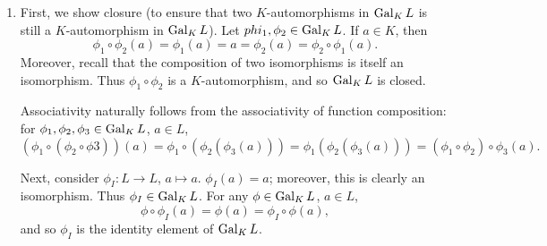 \documentclass{homework}
\begin{document}
\begin{solution}
  \begin{enumerate}[label=(\alph*)]
    \item First, we show closure (to ensure that two $K$-automorphisms in $\operatorname{Gal}_KL$ is still a
      $K$-automorphism in $\operatorname{Gal}_KL$). Let $phi_1,\phi_2\in \operatorname{Gal}_KL$. If $a\in K$, then \[
        \phi_1\circ \phi_2(a)=\phi_1(a)=a=\phi_2(a)=\phi_2\circ \phi_1(a)
      .\] Moreover, recall that the composition of two isomorphisms is itself an isomorphism. Thus
      $\phi_1\circ \phi_2$ is a $K$-automorphism, and so $\operatorname{Gal}_KL$ is closed.

      Associativity naturally follows from the associativity of function composition: for
      $\phi_1,\phi_2,\phi_3\in \operatorname{Gal}_KL$, $a\in L$, \[
        (\phi_1\circ (\phi_2\circ \phi3))(a)=\phi_1\circ
        (\phi_2(\phi_3(a)))=\phi_1(\phi_2(\phi_3(a)))=(\phi_1\circ \phi_2)\circ \phi_3(a)
      .\] 

      Next, consider $\phi_I:L\to L$, $a\mapsto a$. $\phi_I(a)=a$; moreover, this is clearly an
      isomorphism. Thus $\phi_I\in \operatorname{Gal}_KL$. For any $\phi\in \operatorname{Gal}_KL$, $a\in L$, \[
        \phi\circ \phi_I(a)=\phi(a)=\phi_I\circ \phi(a)
      ,\] and so $\phi_I$ is the identity element of $\operatorname{Gal}_KL$.


\end{enumerate}
\end{solution}
\end{document}
